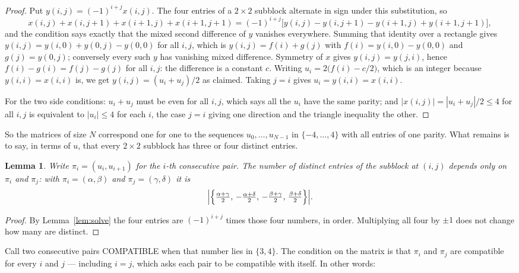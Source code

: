 \documentclass[11pt,a4paper]{article}
\theoremstyle{plain}
\newtheorem{lemma}[theorem]{Lemma}
\theoremstyle{definition}
\begin{document}
\begin{proof}
Put $y(i,j)=(-1)^{i+j}x(i,j)$. The four entries of a $2\times2$ subblock alternate in sign
under this substitution, so
\[
x(i,j)+x(i,j{+}1)+x(i{+}1,j)+x(i{+}1,j{+}1)
=(-1)^{i+j}\bigl[y(i,j)-y(i,j{+}1)-y(i{+}1,j)+y(i{+}1,j{+}1)\bigr],
\]
and the condition says exactly that the mixed second difference of $y$ vanishes everywhere.
Summing that identity over a rectangle gives
$y(i,j)=y(i,0)+y(0,j)-y(0,0)$ for all $i,j$, which is $y(i,j)=f(i)+g(j)$ with
$f(i)=y(i,0)-y(0,0)$ and $g(j)=y(0,j)$; conversely every such $y$ has vanishing mixed
difference. Symmetry of $x$ gives $y(i,j)=y(j,i)$, hence $f(i)-g(i)=f(j)-g(j)$ for all $i,j$:
the difference is a constant $c$. Writing $u_i=2\bigl(f(i)-c/2\bigr)$, which is an integer
because $y(i,i)=x(i,i)$ is, we get $y(i,j)=(u_i+u_j)/2$ as claimed. Taking $j=i$ gives
$u_i=y(i,i)=x(i,i)$.

For the two side conditions: $u_i+u_j$ must be even for all $i,j$, which says all the $u_i$ have
the same parity; and $|x(i,j)|=|u_i+u_j|/2\le4$ for all $i,j$ is equivalent to $|u_i|\le4$
for each $i$, the case $j=i$ giving one direction and the triangle inequality the other.
\end{proof}

So the matrices of size $N$ correspond one for one to the sequences $u_0,\dots,u_{N-1}$ in
$\{-4,\dots,4\}$ with all entries of one parity. What remains is to say, in terms of $u$,
that every $2\times2$ subblock has three or four distinct entries.

\begin{lemma}\label{lem:block}
Write $\pi_i=(u_i,u_{i+1})$ for the $i$-th consecutive pair. The number of distinct entries of
the subblock at $(i,j)$ depends only on $\pi_i$ and $\pi_j$: with $\pi_i=(\alpha,\beta)$ and
$\pi_j=(\gamma,\delta)$ it is
\[
\Bigl|\Bigl\{\tfrac{\alpha+\gamma}{2},\,-\tfrac{\alpha+\delta}{2},\,
-\tfrac{\beta+\gamma}{2},\,\tfrac{\beta+\delta}{2}\Bigr\}\Bigr| .
\]
\end{lemma}

\begin{proof}
By Lemma~\ref{lem:solve} the four entries are $(-1)^{i+j}$ times those four numbers, in
order. Multiplying all four by $\pm1$ does not change how many are distinct.
\end{proof}

Call two consecutive pairs COMPATIBLE when that number lies in $\{3,4\}$. The condition on the
matrix is that $\pi_i$ and $\pi_j$ are compatible for every $i$ and $j$ --- including $i=j$,
which asks each pair to be compatible with itself. In other words:
\end{document}
